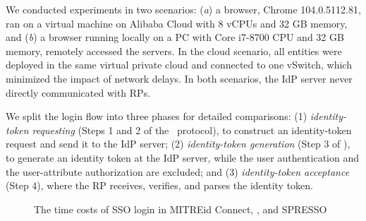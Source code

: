 We conducted experiments in two scenarios: (\emph{a}) a browser, Chrome 104.0.5112.81, ran on a virtual machine on Alibaba Cloud with 8 vCPUs and 32 GB memory, and (\emph{b}) a browser running locally on a PC with Core i7-8700 CPU and 32 GB memory, remotely accessed the servers.
In the cloud scenario, all entities were deployed in the same virtual private cloud and connected to one vSwitch, which minimized the impact of network delays.
In both scenarios, the IdP server never directly communicated with RPs.

 We split the login flow into three phases for detailed comparisons: (1)
{\em identity-token requesting} (Steps 1 and 2 of the \usso\ protocol), to construct an identity-token request and send it to the IdP server; (2) {\em identity-token generation} (Step 3 of \usso), to generate an identity token at the IdP server, while the user authentication and the user-attribute authorization are excluded; and (3) {\em identity-token acceptance} (Step 4), where the RP receives, verifies, and parses the identity token.

\begin{figure}[tb]
  \centering
  \caption{The time costs of SSO login in MITREid Connect, \usso, and SPRESSO}
  \label{fig:evaluation}
\end{figure}


